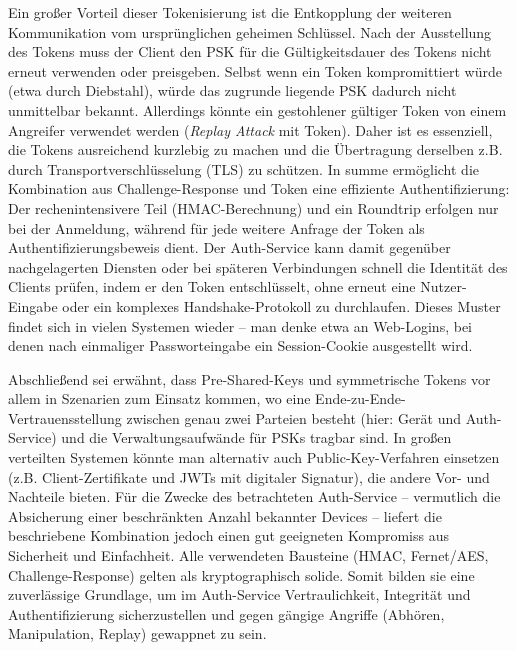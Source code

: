 Ein großer Vorteil dieser Tokenisierung ist die Entkopplung der weiteren Kommunikation vom ursprünglichen geheimen Schlüssel. Nach der Ausstellung des Tokens muss der Client den PSK für die Gültigkeitsdauer des Tokens nicht erneut verwenden oder preisgeben. Selbst wenn ein Token kompromittiert würde (etwa durch Diebstahl), würde das zugrunde liegende PSK dadurch nicht unmittelbar bekannt. Allerdings könnte ein gestohlener gültiger Token von einem Angreifer verwendet werden (\textit{Replay Attack} mit Token). Daher ist es essenziell, die Tokens ausreichend kurzlebig zu machen und die Übertragung derselben z.B. durch Transportverschlüsselung (TLS) zu schützen.
In summe ermöglicht die Kombination aus Challenge-Response und Token eine effiziente Authentifizierung: Der rechenintensivere Teil (HMAC-Berechnung) und ein Roundtrip erfolgen nur bei der Anmeldung, während für jede weitere Anfrage der Token als Authentifizierungsbeweis dient. Der Auth-Service kann damit gegenüber nachgelagerten Diensten oder bei späteren Verbindungen schnell die Identität des Clients prüfen, indem er den Token entschlüsselt, ohne erneut eine Nutzer-Eingabe oder ein komplexes Handshake-Protokoll zu durchlaufen. Dieses Muster findet sich in vielen Systemen wieder – man denke etwa an Web-Logins, bei denen nach einmaliger Passworteingabe ein Session-Cookie ausgestellt wird.

Abschließend sei erwähnt, dass Pre-Shared-Keys und symmetrische Tokens vor allem in Szenarien zum Einsatz kommen, wo eine Ende-zu-Ende-Vertrauensstellung zwischen genau zwei Parteien besteht (hier: Gerät und Auth-Service) und die Verwaltungsaufwände für PSKs tragbar sind. In großen verteilten Systemen könnte man alternativ auch Public-Key-Verfahren einsetzen (z.B. Client-Zertifikate und JWTs mit digitaler Signatur), die andere Vor- und Nachteile bieten. Für die Zwecke des betrachteten Auth-Service – vermutlich die Absicherung einer beschränkten Anzahl bekannter Devices – liefert die beschriebene Kombination jedoch einen gut geeigneten Kompromiss aus Sicherheit und Einfachheit. Alle verwendeten Bausteine (HMAC, Fernet/AES, Challenge-Response) gelten als kryptographisch solide. Somit bilden sie eine zuverlässige Grundlage, um im Auth-Service Vertraulichkeit, Integrität und Authentifizierung sicherzustellen und gegen gängige Angriffe (Abhören, Manipulation, Replay) gewappnet zu sein.

